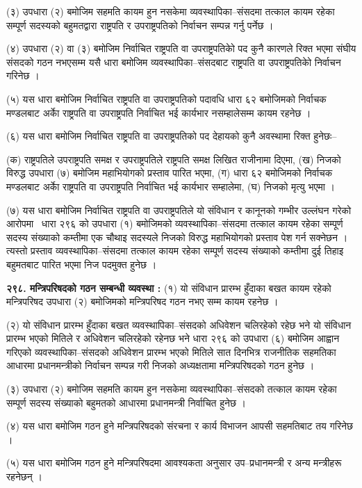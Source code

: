 (३) उपधारा (२) बमोजिम सहमति कायम हुन नसकेमा व्यवस्थापिका–संसदमा तत्काल कायम रहेका सम्पूर्ण सदस्यको बहुमतद्वारा राष्ट्रपति र उपराष्ट्रपतिको निर्वाचन सम्पन्न गर्नु पर्नेछ ।

(४) उपधारा (२) वा (३) बमोजिम निर्वाचित राष्ट्रपति वा उपराष्ट्रपतिकोे पद कुनै कारणले रिक्त भएमा संघीय संसदको गठन नभएसम्म यसै धारा बमोजिम व्यवस्थापिका–संसदबाट राष्ट्रपति वा उपराष्ट्रपतिकोे निर्वाचन गरिनेछ ।

(५) यस धारा बमोजिम निर्वाचित राष्ट्रपति वा उपराष्ट्रपतिको पदावधि धारा ६२ बमोजिमको निर्वाचक मण्डलबाट अर्काे राष्ट्रपति वा उपराष्ट्रपति निर्वाचित भई कार्यभार नसम्हालेसम्म कायम रहनेछ ।

(६) यस धारा बमोजिम निर्वाचित राष्ट्रपति वा उपराष्ट्रपतिको पद देहायको कुनै अवस्थामा रिक्त हुनेछः–

(क) राष्ट्रपतिले उपराष्ट्रपति समक्ष र उपराष्ट्रपतिले राष्ट्रपति समक्ष लिखित राजीनामा दिएमा,
(ख) निजको विरुद्ध उपधारा (७) बमोजिम महाभियोगको प्रस्ताव पारित भएमा,
(ग) धारा ६२ बमोजिमको निर्वाचक मण्डलबाट अर्काे राष्ट्रपति वा उपराष्ट्रपति निर्वाचित भई कार्यभार सम्हालेमा,
(घ) निजको मृत्यु भएमा ।

(७) यस धारा बमोजिम निर्वाचित राष्ट्रपति वा उपराष्ट्रपतिले यो संविधान र कानूनको गम्भीर उल्लंघन गरेको आरोपमा  धारा २९६ को उपधारा (१) बमोजिमको व्यवस्थापिका–संसदमा तत्काल कायम रहेका सम्पूर्ण सदस्य संख्याको कम्तीमा एक चौथाइ सदस्यले निजको विरुद्ध महाभियोगको प्रस्ताव पेश गर्न सक्नेछन । त्यस्तो प्रस्ताव व्यवस्थापिका–संसदमा तत्काल कायम रहेका सम्पूर्ण सदस्य संख्याको कम्तीमा दुई तिहाइ बहुमतबाट पारित भएमा निज पदमुक्त हुनेछ ।

\textbf{२९८. मन्त्रिपरिषदको गठन सम्बन्धी व्यवस्था :} (१) यो संविधान प्रारम्भ हुँदाका बखत कायम रहेको मन्त्रिपरिषद उपधारा (२) बमोजिमको मन्त्रिपरिषद गठन नभए सम्म कायम रहनेछ ।

(२) यो संविधान प्रारम्भ हुँदाका बखत व्यवस्थापिका–संसदको अधिवेशन चलिरहेको रहेछ भने यो संविधान प्रारम्भ भएको मितिले र अधिवेशन चलिरहेको रहेनछ भने धारा २९६ को उपधारा (६) बमोजिम आह्वान गरिएको व्यवस्थापिका–संसदको अधिवेशन प्रारम्भ भएको मितिले सात दिनभित्र राजनीतिक सहमतिका आधारमा प्रधानमन्त्रीको निर्वाचन सम्पन्न गरी निजको अध्यक्षतामा मन्त्रिपरिषदको गठन हुनेछ ।

(३) उपधारा (२) बमोजिम सहमति कायम हुन नसकेमा व्यवस्थापिका–संसदको तत्काल कायम रहेका सम्पूर्ण सदस्य संख्याको बहुमतको आधारमा प्रधानमन्त्री निर्वाचित हुनेछ ।

(४) यस धारा बमोजिम गठन हुने मन्त्रिपरिषदको संरचना र कार्य विभाजन आपसी सहमतिबाट तय गरिनेछ ।

(५) यस धारा बमोजिम गठन हुने मन्त्रिपरिषदमा आवश्यकता अनुसार उप–प्रधानमन्त्री र अन्य मन्त्रीहरू रहनेछन् ।


